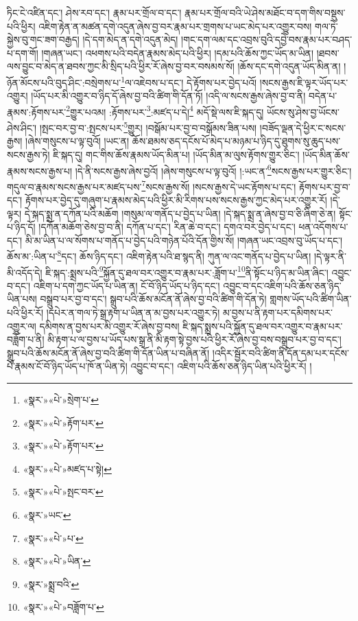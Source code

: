 ཏིང་ངེ་འཛིན་དང་། ཤེས་རབ་དང་། རྣམ་པར་གྲོལ་བ་དང་། རྣམ་པར་གྲོལ་བའི་ཡེ་ཤེས་མཐོང་བ་དག་གིས་བསྡུས་པའི་ཕྱིར། འཇིག་རྟེན་ན་མཚན་དགེ་འདུན་ཞེས་བྱ་བར་རྣམ་པར་གྲགས་པ་ཡང་མེད་པར་འགྱུར་བས། གལ་ཏེ་སྐྱེས་བུ་གང་ཟག་བརྒྱད། །དེ་དག་མེད་ན་དགེ་འདུན་མེད། །གང་དག་ལམ་དང་འབྲས་བུའི་དབྱེ་བས་རྣམ་པར་བཤད་པ་དག་གོ། །གཞན་ཡང་། འཕགས་པའི་བདེན་རྣམས་མེད་པའི་ཕྱིར། །དམ་པའི་ཆོས་ཀྱང་ཡོད་མ་ཡིན། །ཐབས་ལས་བྱུང་བ་མེད་ན་ཐབས་ཀྱང་མི་སྲིད་པའི་ཕྱིར་རོ་ཞེས་བྱ་བར་བསམས་སོ། །ཆོས་དང་དགེ་འདུན་ཡོད་མིན་ན། །ཉོན་མོངས་པའི་བུད་ཤིང་:བསྲེགས་པ་\footnote{«སྣར་»«པེ་»སྲེག་པ་}ལ་འཇེབས་པ་དང་། དེ་རྟོགས་པར་བྱེད་པའོ། །སངས་རྒྱས་ཇི་ལྟར་ཡོད་པར་འགྱུར། །ཡོད་པར་མི་འགྱུར་བ་ཉིད་དོ་ཞེས་བྱ་བའི་ཚིག་གི་དོན་ཏོ། །འདི་ལ་སངས་རྒྱས་ཞེས་བྱ་བ་ནི། བདེན་པ་རྣམས་:རྟོགས་པར་\footnote{«སྣར་»«པེ་»རྟོག་པར་}གྱུར་པའམ། :རྟོགས་པར་\footnote{«སྣར་»«པེ་»རྟོག་པར་}:མཛད་པ་དེ།\footnote{«སྣར་»«པེ་»མཛད་པ་སྟེ།} མདོ་སྡེ་ལས་ཇི་སྐད་དུ། ཡོངས་སུ་ཤེས་བྱ་ཡོངས་ཤེས་ཤིང་། །སྤང་བར་བྱ་བ་:སྤངས་པར་\footnote{«སྣར་»«པེ་»སྤང་བར་}གྱུར། །བསྒོམ་པར་བྱ་བ་བསྒོམས་ཟིན་པས། །བཟོད་ལྡན་དེ་ཕྱིར་ང་སངས་རྒྱས། །ཞེས་གསུངས་པ་ལྟ་བུའོ། །ཡང་ན། ཆོས་ཐམས་ཅད་དངོས་པོ་མེད་པ་མཉམ་པ་ཉིད་དུ་ཐུགས་སུ་ཆུད་པས་སངས་རྒྱས་ཏེ། ཇི་སྐད་དུ། གང་གིས་ཆོས་རྣམས་ཡོད་མིན་པ། །ཡོད་མིན་མ་ལུས་རྟོགས་གྱུར་ཅིང་། །ཡོད་མིན་ཆོས་རྣམས་སངས་རྒྱས་པ། །དེ་ནི་སངས་རྒྱས་ཞེས་བྱའོ། །ཞེས་གསུངས་པ་ལྟ་བུའོ། །:ཡང་ན་\footnote{«སྣར་»ཡང་}སངས་རྒྱས་པར་གྱུར་ཅིང་། གདུལ་བ་རྣམས་སངས་རྒྱས་པར་མཛད་པས་\footnote{«སྣར་»«པེ་»པ་}སངས་རྒྱས་སོ། །སངས་རྒྱས་དེ་ཡང་རྟོགས་པ་དང་། རྟོགས་པར་བྱ་བ་དང་། རྟོགས་པར་བྱེད་དུ་གཞུག་པ་རྣམས་མེད་པའི་ཕྱིར་མི་རིགས་པས་སངས་རྒྱས་ཀྱང་མེད་པར་འགྱུར་རོ། །དེ་ལྟར། དེ་སྐད་སྨྲ་ན་དཀོན་པའི་མཆོག །གསུམ་ལ་གནོད་པ་བྱེད་པ་ཡིན། །དེ་སྐད་སྨྲ་ན་ཞེས་བྱ་བ་ཅི་ཞིག་ཅེ་ན། སྟོང་པ་ཉིད་དོ། །དཀོན་མཆོག་ཅེས་བྱ་བ་ནི། དཀོན་པ་དང་། རིན་ཆེ་བ་དང་། དགའ་བར་བྱེད་པ་དང་། ཕན་འདོགས་པ་དང་། མི་མ་ཡིན་པ་ལ་སོགས་པ་གནོད་པ་བྱེད་པའི་གཉེན་པོའི་དོན་གྱིས་སོ། །གཞན་ཡང་འབྲས་བུ་ཡོད་པ་དང་། ཆོས་མ་:ཡིན་པ་\footnote{«སྣར་»«པེ་»ཡིན་}དང་། ཆོས་ཉིད་དང་། འཇིག་རྟེན་པའི་ཐ་སྙད་ནི། ཀུན་ལ་འང་གནོད་པ་བྱེད་པ་ཡིན། །དེ་ལྟར་ནི་མི་འདོད་དེ། ཇི་སྐད་:སྨྲས་པའི་\footnote{«སྣར་»སྨྲ་བའི་}སྐྱོན་དུ་ཐལ་བར་འགྱུར་བ་རྣམ་པར་:ཟློག་པ་\footnote{«སྣར་»«པེ་»བཟློག་པ་}ནི་སྟོང་པ་ཉིད་མ་ཡིན་ཞིང་། འབྱུང་བ་དང་། འཇིག་པ་དག་ཀྱང་ཡོད་པ་ཡིན་ན། ངོ་བོ་ཉིད་ཡོད་པ་ཉིད་དང་། འབྱུང་བ་དང་འཇིག་པའི་ཆོས་ཅན་ཉིད་ཡིན་པས། བསྒྲུབ་པར་བྱ་བ་དང་། སྒྲུབ་པའི་ཆོས་མངོན་ནོ་ཞེས་བྱ་བའི་ཚིག་གི་དོན་ཏེ། གླགས་ཡོད་པའི་ཚིག་ཡིན་པའི་ཕྱིར་རོ། །དཔེར་ན་གལ་ཏེ་སྒྲ་རྟག་པ་ཡིན་ན་མ་བྱས་པར་འགྱུར་ཏེ། མ་བྱས་པ་ནི་རྟག་པར་དམིགས་པར་འགྱུར་ལ། དམིགས་ན་བྱས་པར་མི་འགྱུར་རོ་ཞེས་བྱ་བས། ཇི་སྐད་སྨྲས་པའི་སྐྱོན་དུ་ཐལ་བར་འགྱུར་བ་རྣམ་པར་བཟློག་པ་ནི། མི་རྟག་པ་ལ་བྱས་པ་ཡོད་པས་སྒྲ་ནི་མི་རྟག་སྟེ་བྱས་པའི་ཕྱིར་རོ་ཞེས་བྱ་བས་བསྒྲུབ་པར་བྱ་བ་དང་། སྒྲུབ་པའི་ཆོས་མངོན་ནོ་ཞེས་བྱ་བའི་ཚིག་གི་དོན་ཡིན་པ་བཞིན་ནོ། །འདིར་སྦྱོར་བའི་ཚིག་ནི་དོན་དམ་པར་དངོས་པོ་རྣམས་ངོ་བོ་ཉིད་ཡོད་པ་ཁོ་ན་ཡིན་ཏེ། འབྱུང་བ་དང་། འཇིག་པའི་ཆོས་ཅན་ཉིད་ཡིན་པའི་ཕྱིར་རོ། །
